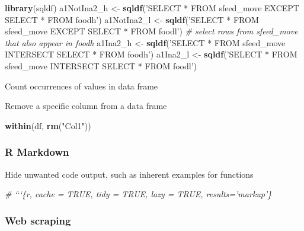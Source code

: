 \documentclass[10,portrait]{article}
\newenvironment{Shaded}{\begin{snugshade}}{\end{snugshade}}
\newcommand{\KeywordTok}[1]{\textcolor[rgb]{0.13,0.29,0.53}{\textbf{#1}}}
\newcommand{\StringTok}[1]{\textcolor[rgb]{0.31,0.60,0.02}{#1}}
\newcommand{\CommentTok}[1]{\textcolor[rgb]{0.56,0.35,0.01}{\textit{#1}}}
\newcommand{\OperatorTok}[1]{\textcolor[rgb]{0.81,0.36,0.00}{\textbf{#1}}}
\newcommand{\NormalTok}[1]{#1}
\begin{document}
\begin{Shaded}
\begin{Highlighting}[]
\KeywordTok{library}\NormalTok{(sqldf)}
\NormalTok{a1NotIna2_h  <-}\StringTok{ }\KeywordTok{sqldf}\NormalTok{(}\StringTok{'SELECT * FROM sfeed_move EXCEPT SELECT * FROM foodh'}\NormalTok{)}
\NormalTok{a1NotIna2_l  <-}\StringTok{ }\KeywordTok{sqldf}\NormalTok{(}\StringTok{'SELECT * FROM sfeed_move EXCEPT SELECT * FROM foodl'}\NormalTok{)}
\CommentTok{# select rows from sfeed_move that also appear in foodh}
\NormalTok{a1Ina2_h  <-}\StringTok{ }\KeywordTok{sqldf}\NormalTok{(}\StringTok{'SELECT * FROM sfeed_move INTERSECT SELECT * FROM foodh'}\NormalTok{)}
\NormalTok{a1Ina2_l  <-}\StringTok{ }\KeywordTok{sqldf}\NormalTok{(}\StringTok{'SELECT * FROM sfeed_move INTERSECT SELECT * FROM foodl'}\NormalTok{)}
\end{Highlighting}
\end{Shaded}

Count occurrences of values in data frame

\begin{Shaded}
\end{Shaded}

Remove a specific column from a data frame

\begin{Shaded}
\begin{Highlighting}[]
\KeywordTok{within}\NormalTok{(df, }\KeywordTok{rm}\NormalTok{(}\StringTok{"Col1"}\NormalTok{))}
\end{Highlighting}
\end{Shaded}

\subsubsection{R Markdown}\label{r-markdown}

Hide unwanted code output, such as inherent examples for functions

\begin{Shaded}
\begin{Highlighting}[]
\CommentTok{# ```\{r, cache = TRUE, tidy = TRUE, lazy = TRUE, results='markup'\}}
\end{Highlighting}
\end{Shaded}

\subsubsection{Web scraping}\label{web-scraping}
\end{document}
